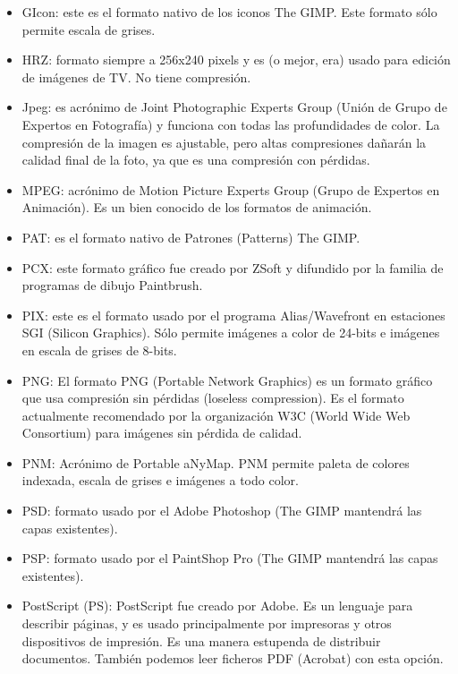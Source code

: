 \begin{itemize}
\item GIcon: este  es el formato nativo de los  iconos {\sf The GIMP}.
Este formato sólo permite escala de grises.

\item HRZ: formato siempre a 256x240  pixels y es (o mejor, era) usado
para edición de imágenes de TV. No tiene compresión.

\item Jpeg:  es acrónimo  de Joint  Photographic Experts  Group (Unión
de  Grupo  de  Expertos  en  Fotografía)  y  funciona  con  todas  las
profundidades de color. La compresión  de la imagen es ajustable, pero
altas compresiones dañarán la calidad final  de la foto, ya que es una
compresión con pérdidas.

\item  MPEG:  acrónimo  de  Motion Picture  Experts  Group  (Grupo  de
Expertos  en  Animación). Es  un  bien  conocido  de los  formatos  de
animación.

\item PAT: es el formato nativo de Patrones (Patterns) {\sf The GIMP}.

\item PCX: este formato gráfico fue  creado por ZSoft y difundido por 
la familia de programas de dibujo Paintbrush.                         

\item PIX: este es el formato usado por el programa Alias/Wavefront en
estaciones SGI  (Silicon Graphics). Sólo  permite imágenes a  color de
24-bits e imágenes en escala de grises de 8-bits.

\item PNG:  El formato PNG  (Portable Network Graphics) es  un formato
gráfico que usa compresión sin  pérdidas (loseless compression). Es el
formato actualmente  recomendado por  la organización W3C  (World Wide
Web Consortium) para imágenes sin pérdida de calidad.

\item PNM: Acrónimo de Portable  aNyMap. PNM permite paleta de colores
indexada, escala de grises e imágenes a todo color.

\item  PSD: formato  usado  por  el Adobe  Photoshop  ({\sf The  GIMP}
mantendrá las capas existentes).

\item  PSP:  formato  usado  por  el PaintShop  Pro  ({\sf  The  GIMP}
mantendrá las capas existentes).

\item PostScript (PS): PostScript fue creado por Adobe. Es un lenguaje
para describir  páginas, y  es usado  principalmente por  impresoras y
otros dispositivos de impresión. Es una manera estupenda de distribuir
documentos.  También  podemos leer  ficheros  PDF  (Acrobat) con  esta
opción.


\end{itemize}
